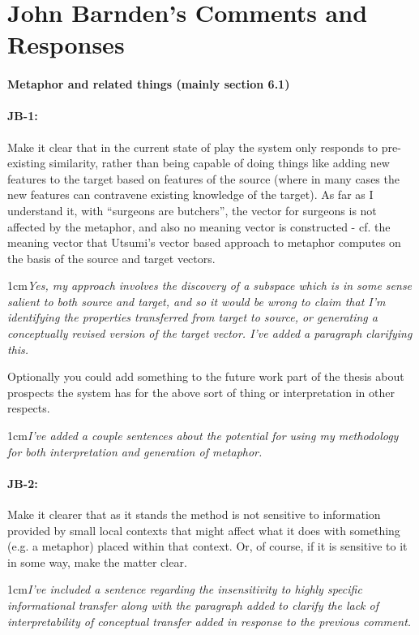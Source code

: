\documentclass[11pt,a4paper]{article}
\newcommand{\res}[1]{\vspace{0.25cm} \begin{adjustwidth}{1cm}{}\emph{#1}\end{adjustwidth}}
\begin{document}
\section{John Barnden's Comments and Responses}

\paragraph{Metaphor and related things  (mainly section 6.1)}

\paragraph{JB-1:} Make it clear that in the current state of play the system only responds to pre-existing similarity, rather than being capable of doing things like adding new features to the target based on features of the source (where in many cases the new features can contravene existing knowledge of the target).  As far as I understand it, with ``surgeons are butchers'', the vector for surgeons is not affected by the metaphor, and also no meaning vector is constructed - cf. the meaning vector that Utsumi's vector based approach to metaphor computes on the basis of the source and target vectors.

\res{Yes, my approach involves the discovery of a subspace which is in some sense salient to both source and target, and so it would be wrong to claim that I'm identifying the properties transferred from target to source, or generating a conceptually revised version of the target vector.  I've added a paragraph clarifying this.}

Optionally you could add something to the future work part of the thesis about prospects the system has for the above sort of thing or interpretation in other respects.

\res{I've added a couple sentences about the potential for using my methodology for both interpretation and generation of metaphor.}

\paragraph{JB-2:} Make it clearer that as it stands the method is not sensitive to information provided by small local contexts that might affect what it does with something (e.g. a metaphor) placed within that context. Or, of course, if it is sensitive to it in some way, make the matter clear.

\res{I've included a sentence regarding the insensitivity to highly specific informational transfer along with the paragraph added to clarify the lack of interpretability of conceptual transfer added in response to the previous comment.}
\end{document}
